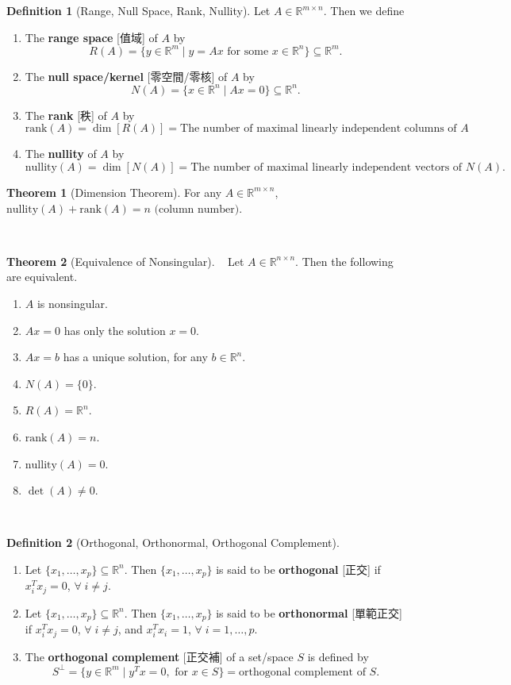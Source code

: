 \documentclass{article}
\theoremstyle{definition}
\newtheorem{definition}{Definition}[section]
\newtheorem{theorem}{Theorem}[section]
\numberwithin{theorem}{section}
\numberwithin{equation}{section}
\begin{document}
\begin{definition}[Range, Null Space, Rank, Nullity]
Let $A \in \mathbb{R}^{m \times n}$. Then we define
\begin{enumerate}
\item The \textbf{range space} [值域] of $A$ by
  \[
   R(A) = \{ y \in \mathbb{R}^{m} \mid y = Ax \text{ for some } x \in \mathbb{R}^{n} \} \subseteq \mathbb{R}^{m}.
   \]
\item The \textbf{null space/kernel} [零空間/零核] of $A$ by
  \[
   N(A) = \{ x \in \mathbb{R}^{n} \mid Ax = 0 \} \subseteq \mathbb{R}^{n}.
   \]
\item The \textbf{rank} [秩] of $A$ by 
  \[
   \text{rank}(A) = \dim [R(A)] = \text{The number of maximal linearly independent columns of } A
   \]
\item The \textbf{nullity} of $A$ by 
  \[
   \text{nullity}(A) = \dim [N(A)] = \text{The number of maximal linearly independent vectors of } N(A).
   \]
\end{enumerate}
\end{definition}

\begin{theorem}[Dimension Theorem]
    For any $A\in \mathbb{R}^{m\times n}$, $\text{nullity}(A) + \text{rank}(A) = n \text{ (column number)}$.
\end{theorem} 
\begin{theorem}[Equivalence of Nonsingular] 
    Let $A\in \mathbb{R}^{n\times n}$. Then the following are equivalent.
\begin{enumerate}
\item $A$ is nonsingular. 
\item $Ax=0$ has only the solution $x=0$.
\item $Ax=b$ has a unique solution, for any $b\in\mathbb{R}^n$.
\item $N(A) = \{0\}$.
\item $R(A)= \mathbb{R}^n$.
\item $\text{rank}(A) = n$.
\item $\text{nullity}(A) = 0.$
\item $\det(A) \neq 0.$
\end{enumerate} 
\end{theorem}

\begin{definition}[Orthogonal, Orthonormal, Orthogonal Complement]
    \begin{enumerate}
\item Let $\{x_1, \ldots, x_p\} \subseteq \mathbb{R}^{n}$. Then $\{x_1, \ldots, x_p\}$ is said to be \textbf{orthogonal} [正交] if $x_i^T x_j = 0$, $\forall\; i \neq j$. 
\item Let $\{x_1, \ldots, x_p\} \subseteq \mathbb{R}^{n}$. Then $\{x_1, \ldots, x_p\}$ is said to be \textbf{orthonormal} [單範正交] if $x_i^T x_j = 0$, $\forall\; i \neq j$, and  $x_i^T x_i = 1$, $\forall\; i=1,\ldots ,p$. 
\item The \textbf{orthogonal complement} [正交補] of a set/space $S$ is defined by
  \[
   S^\perp = \{ y \in \mathbb{R}^{m} \mid y^T x = 0, \text{ for } x \in S \} = \text{orthogonal complement of } S.
   \]
\end{enumerate} 
\end{definition} 
\end{document}
